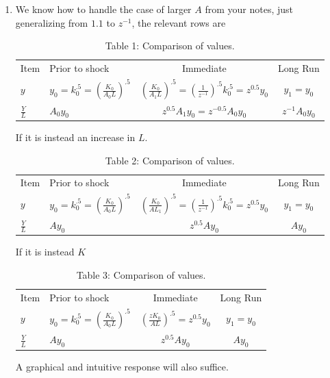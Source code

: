 \documentclass[12pt]{article}
\begin{document}
\begin{enumerate}
\begin{enumerate}
\item We know how to handle the case of larger $A$ from your notes, just
generalizing from $1.1$ to $z^{-1}$, the relevant rows are     
\begin{table}[htbp]
\centering
\begin{tabular}{llcc}
Item & Prior to shock & Immediate & Long Run \\ 
$y$ & \multicolumn{1}{|l}{$y_{0}=k_{0}^{.5}=\left( \frac{K_{0}}{A_{0}L}%
\right) ^{.5}$} & \multicolumn{1}{|c}{$\left( \frac{K_{0}}{A_{1}L}\right)
^{.5}=\left( \frac{1}{z^{-1}}\right) ^{.5}k_{0}^{.5}=z^{0.5}y_{0}$ } & 
\multicolumn{1}{|c}{$y_{1}=y_{0}$} \\ 
$\frac{Y}{L}$ & \multicolumn{1}{|l}{$A_{0}y_{0}$} & \multicolumn{1}{|c}{$%
z^{0.5}A_{1}y_{0}=z^{-0.5}A_{0}y_{0}$} & \multicolumn{1}{|c}{$%
z^{-1}A_{0}y_{0}$}%
\end{tabular}
\caption{Table 1: Comparison of values.}
\end{table}
If it is instead an increase in $L.$%
\begin{table}[htbp]
\centering
\begin{tabular}{llcc}
Item & Prior to shock & Immediate & Long Run \\ 
$y$ & \multicolumn{1}{|l}{$y_{0}=k_{0}^{.5}=\left( \frac{K_{0}}{A_{0}L}%
\right) ^{.5}$} & \multicolumn{1}{|c}{$\left( \frac{K_{0}}{AL_{1}}\right)
^{.5}=\left( \frac{1}{z^{-1}}\right) ^{.5}k_{0}^{.5}=z^{0.5}y_{0}$ } & 
\multicolumn{1}{|c}{$y_{1}=y_{0}$} \\ 
$\frac{Y}{L}$ & \multicolumn{1}{|l}{$Ay_{0}$} & \multicolumn{1}{|c}{$%
z^{0.5}Ay_{0}$} & \multicolumn{1}{|c}{$Ay_{0}$}%
\end{tabular}
\caption{Table 2: Comparison of values.}
\end{table}
If it is instead $K$ 
\begin{table}[htbp]
\centering
\begin{tabular}{llcc}
Item & Prior to shock & Immediate & Long Run \\ 
$y$ & \multicolumn{1}{|l}{$y_{0}=k_{0}^{.5}=\left( \frac{K_{0}}{A_{0}L}%
\right) ^{.5}$} & \multicolumn{1}{|c}{$\left( \frac{zK_{0}}{AL}\right)
^{.5}=z^{0.5}y_{0}$ } & \multicolumn{1}{|c}{$y_{1}=y_{0}$} \\ 
$\frac{Y}{L}$ & \multicolumn{1}{|l}{$Ay_{0}$} & \multicolumn{1}{|c}{$%
z^{0.5}Ay_{0}$} & \multicolumn{1}{|c}{$Ay_{0}$}%
\end{tabular}
\caption{Table 3: Comparison of values.}
\end{table}A graphical and intuitive response will also suffice. 


\end{enumerate}
\end{enumerate}
\end{document}

